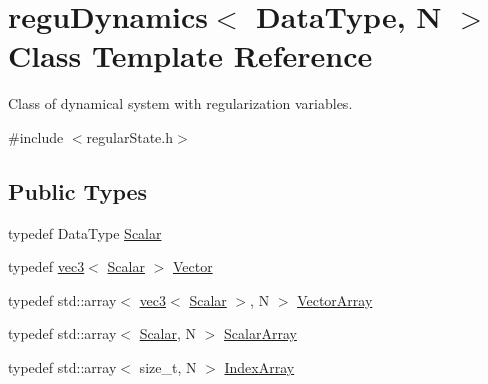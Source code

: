 \hypertarget{classregu_dynamics}{}\section{regu\+Dynamics$<$ Data\+Type, N $>$ Class Template Reference}
\label{classregu_dynamics}


Class of dynamical system with regularization variables.  




{\ttfamily \#include $<$regular\+State.\+h$>$}

\subsection*{Public Types}
\begin{DoxyCompactItemize}
\item 
typedef Data\+Type \mbox{\hyperlink{classregu_dynamics_a359c55370b4dee032396f0df86ad5fab}{Scalar}}
\item 
typedef \mbox{\hyperlink{structvec3}{vec3}}$<$ \mbox{\hyperlink{classregu_dynamics_a359c55370b4dee032396f0df86ad5fab}{Scalar}} $>$ \mbox{\hyperlink{classregu_dynamics_a454c165b5e838c6b44a3f18d6722a9e2}{Vector}}
\item 
typedef std\+::array$<$ \mbox{\hyperlink{structvec3}{vec3}}$<$ \mbox{\hyperlink{classregu_dynamics_a359c55370b4dee032396f0df86ad5fab}{Scalar}} $>$, N $>$ \mbox{\hyperlink{classregu_dynamics_a86a05253d927e1716f3401e887aa5c8e}{Vector\+Array}}
\item 
typedef std\+::array$<$ \mbox{\hyperlink{classregu_dynamics_a359c55370b4dee032396f0df86ad5fab}{Scalar}}, N $>$ \mbox{\hyperlink{classregu_dynamics_a34b4b77ea3e49e1cdef584ec8bd281dc}{Scalar\+Array}}
\item 
typedef std\+::array$<$ size\+\_\+t, N $>$ \mbox{\hyperlink{classregu_dynamics_a2c9fa7372e4a11be9d85728b4a0e455f}{Index\+Array}}
\end{DoxyCompactItemize}

